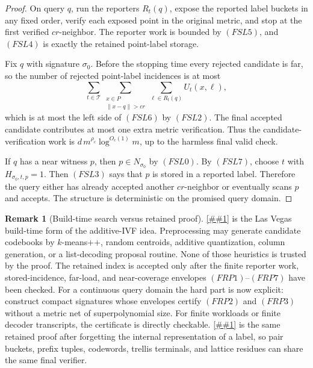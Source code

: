 \documentclass[10pt]{article}
\newcommand{\Cref}[1]{\ref{##1}}
\theoremstyle{definition}
\newtheorem{remark}[theorem]{Remark}
\begin{document}
\begin{proof}
   On query \(q\), run the reporters \(R_t(q)\), expose the reported label
   buckets in any fixed order, verify each exposed point in the original
   metric, and stop at the first verified \(cr\)-neighbor.  The reporter work
   is bounded by \((FSL5)\), and \((FSL4)\) is exactly the retained
   point-label storage.

   Fix \(q\) with signature \(\sigma_0\).  Before the stopping time every
   rejected candidate is far, so the number of rejected point-label incidences
   is at most
   \[
      \sum_{t\in\mathcal T}
      \sum_{\substack{x\in P\\ \|x-q\|>cr}}
      \sum_{\ell\in R_t(q)}U_t(x,\ell),
   \]
   which is at most the left side of \((FSL6)\) by \((FSL2)\).  The final
   accepted candidate contributes at most one extra metric verification.
   Thus the candidate-verification work is
   \(d\,m^{\rho_c}\log^{O_c(1)}m\), up to the harmless final valid check.

   If \(q\) has a near witness \(p\), then \(p\in N_{\sigma_0}\) by
   \((FSL0)\).  By \((FSL7)\), choose \(t\) with
   \(H_{\sigma_0,t,p}=1\).  Then \((FSL3)\) says that \(p\) is stored in a
   reported label.  Therefore the query either has already accepted another
   \(cr\)-neighbor or eventually scans \(p\) and accepts.  The structure is
   deterministic on the promised query domain.
\end{proof}

\begin{remark}[Build-time search versus retained proof]
   \label{rem:priced-pair-retained-proof}
   \Cref{prop:finite-retained-priced-pair} is the Las Vegas build-time form of
   the additive-IVF idea.  Preprocessing may generate candidate codebooks by
   \(k\)-means++, random centroids, additive quantization, column generation,
   or a list-decoding proposal routine.  None of those heuristics is trusted by
   the proof.  The retained index is accepted only after the finite reporter
   work, stored-incidence, far-load, and near-coverage envelopes
   \((FRP1)\)--\((FRP7)\) have been checked.  For a continuous query domain the
   hard part is now explicit: construct compact signatures whose envelopes
   certify \((FRP2)\) and \((FRP3)\) without a metric net of superpolynomial
   size.  For finite workloads or finite decoder transcripts, the certificate
   is directly checkable.  \Cref{prop:finite-retained-scored-label} is the same
   retained proof after forgetting the internal representation of a label, so
   pair buckets, prefix tuples, codewords, trellis terminals, and lattice
   residues can share the same final verifier.
\end{remark}
\end{document}
